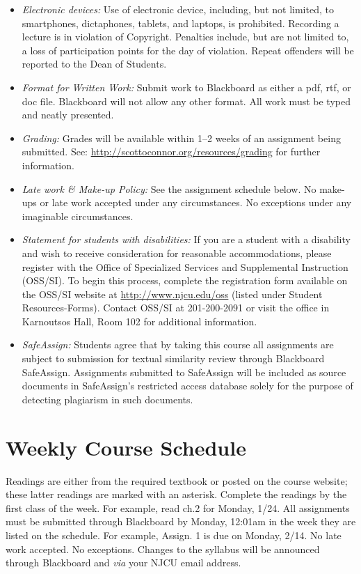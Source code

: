 \documentclass[article,oneside]{memoir}
\begin{document}
\begin{itemize}
\item \textit{Electronic devices:} Use of electronic device, including, but not limited, to smartphones, dictaphones, tablets, and laptops, is prohibited. Recording a lecture is in violation of Copyright. Penalties include, but are not limited to, a loss of participation points for the day of violation. Repeat offenders will be reported to the Dean of Students.

\item \textit{Format for Written Work:} Submit work to Blackboard as either a pdf, rtf, or doc file. Blackboard will not allow any other format. All work must be typed and neatly presented. 


\item \textit{Grading:} Grades will be available within 1--2 weeks of an assignment being submitted. See: \href{http://scottoconnor.org/resources/grading}{http://scottoconnor.org/resources/grading} for further information.


\item \textit{Late work \& Make-up Policy:} See the assignment schedule below. No make-ups or late work accepted under any circumstances. No exceptions under any imaginable circumstances.

\item \textit{Statement for students with disabilities:} If you are a student with a disability and wish to receive consideration for reasonable accommodations, please register with the Office of Specialized Services and Supplemental Instruction (OSS/SI). To begin this process, complete the registration form available on the OSS/SI website at \href{http://www.njcu.edu/oss}{http://www.njcu.edu/oss} (listed under Student Resources-Forms). Contact OSS/SI at 201-200-2091 or visit the office in Karnoutsos Hall, Room 102 for additional information.
 

\item \textit{SafeAssign:} Students agree that by taking this course all assignments are subject to submission for textual similarity review through Blackboard SafeAssign. Assignments submitted to SafeAssign will be included as source documents in SafeAssign's restricted access database solely for the purpose of detecting plagiarism in such documents.  


\end{itemize}




\section{Weekly Course Schedule}
Readings are either from the required textbook or posted on the course website; these latter readings are marked with an asterisk. Complete the readings by the first class of the week. For example, read ch.2 for Monday, 1/24. All assignments must be submitted through Blackboard by Monday, 12:01am in the week they are listed on the schedule. For example, Assign. 1 is due on Monday, 2/14. No late work accepted. No exceptions.  
Changes to the syllabus will be announced through Blackboard and \emph{via} your NJCU email address.  
\end{document}
